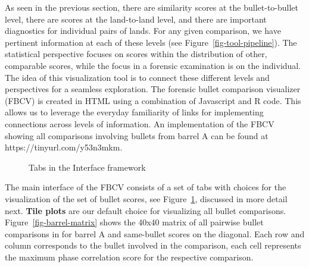 \documentclass[
  number,
  preprint,
  5p,
  twocolumn]{elsarticle}
\begin{document}
As seen in the previous section, there are similarity scores at the
bullet-to-bullet level, there are scores at the land-to-land level, and
there are important diagnostics for individual pairs of lands. For any
given comparison, we have pertinent information at each of these levels
(see Figure~\ref{fig-tool-pipeline}). The statistical perspective
focuses on scores within the distribution of other, comparable scores,
while the focus in a forensic examination is on the individual. The idea
of this visualization tool is to connect these different levels and
perspectives for a seamless exploration. The forensic bullet comparison
visualizer (FBCV) is created in HTML using a combination of Javascript
and R code. This allows us to leverage the everyday familiarity of links
for implementing connections across levels of information. An
implementation of the FBCV showing all comparisons involving bullets
from barrel A can be found at https://tinyurl.com/y53n3mkm.

\begin{figure}


\caption{\label{fig-framework-interface}Tabs in the Interface framework}

\end{figure}%

The main interface of the FBCV consists of a set of tabs with choices
for the visualization of the set of bullet scores, see
Figure~\ref{fig-framework-interface}, discussed in more detail next.
\hfill\newline \textbf{Tile plots} are our default choice for
visualizing all bullet comparisons. Figure~\ref{fig-barrel-matrix} shows
the 40x40 matrix of all pairwise bullet comparisons in for barrel A and
same-bullet scores on the diagonal. Each row and column corresponds to
the bullet involved in the comparison, each cell represents the maximum
phase correlation score for the respective comparison.
\end{document}
